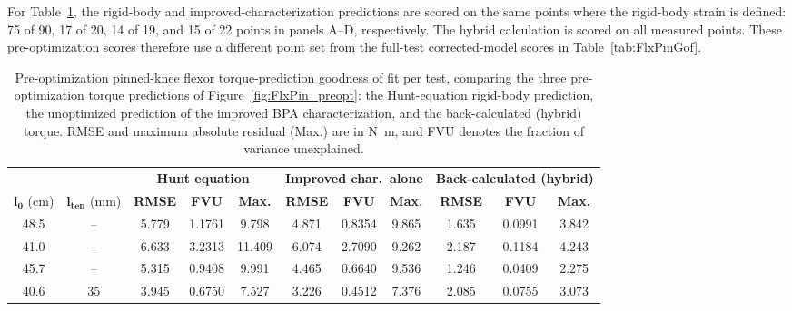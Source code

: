 For Table~\ref{tab:FlxPinPreGof}, the rigid-body and improved-characterization predictions are scored on the same points where the rigid-body strain is defined: 75 of 90, 17 of 20, 14 of 19, and 15 of 22 points in panels A--D, respectively. The hybrid calculation is scored on all measured points. These pre-optimization scores therefore use a different point set from the full-test corrected-model scores in Table~\ref{tab:FlxPinGof}.

\begin{table}[H]
\caption{Pre-optimization pinned-knee flexor torque-prediction goodness of fit per test, comparing the three pre-optimization torque predictions of Figure~\ref{fig:FlxPin_preopt}: the Hunt-equation rigid-body prediction, the unoptimized prediction of the improved BPA characterization, and the back-calculated (hybrid) torque. RMSE and maximum absolute residual (Max.) are in \unit{\newton\meter}, and FVU denotes the fraction of variance unexplained.}
\label{tab:FlxPinPreGof}
\begingroup
\renewcommand{\arraystretch}{1}%
\fontsize{10pt}{12pt}\selectfont
\begin{tabular}{@{}cc ccccccccc@{}}
\toprule
& & \multicolumn{3}{c}{\textbf{Hunt equation}} & \multicolumn{3}{c}{\textbf{Improved char.\ alone}} & \multicolumn{3}{c}{\textbf{Back-calculated (hybrid)}} \\
\cmidrule(lr){3-5} \cmidrule(lr){6-8} \cmidrule(l){9-11}
$\boldsymbol{l_{0}}$ (\unit{\cm}) & $\boldsymbol{l_{\text{ten}}}$ (\unit{\mm}) & \textbf{RMSE} & \textbf{FVU} & \textbf{Max.} & \textbf{RMSE} & \textbf{FVU} & \textbf{Max.} & \textbf{RMSE} & \textbf{FVU} & \textbf{Max.} \\
\midrule
48.5 & -- & 5.779 & 1.1761 & 9.798 & 4.871 & 0.8354 & 9.865 & 1.635 & 0.0991 & 3.842 \\
41.0 & -- & 6.633 & 3.2313 & 11.409 & 6.074 & 2.7090 & 9.262 & 2.187 & 0.1184 & 4.243 \\
45.7 & -- & 5.315 & 0.9408 & 9.991 & 4.465 & 0.6640 & 9.536 & 1.246 & 0.0409 & 2.275 \\
40.6 & 35 & 3.945 & 0.6750 & 7.527 & 3.226 & 0.4512 & 7.376 & 2.085 & 0.0755 & 3.073 \\
\bottomrule
\end{tabular}
\endgroup
\end{table}



